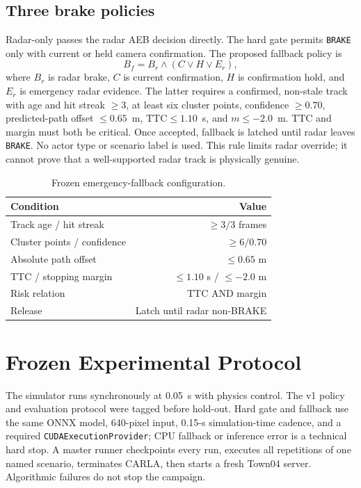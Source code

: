 \documentclass[conference]{IEEEtran}
\begin{document}
\subsection{Three brake policies}
Radar-only passes the radar AEB decision directly. The hard gate permits
\texttt{BRAKE} only with current or held camera confirmation. The proposed
fallback policy is
\begin{equation}
 B_f=B_r\land(C\lor H\lor E_r),
\end{equation}
where $B_r$ is radar brake, $C$ is current confirmation, $H$ is confirmation
hold, and $E_r$ is emergency radar evidence. The latter requires a confirmed,
non-stale track with age and hit streak $\geq3$, at least six cluster points,
confidence $\geq0.70$, predicted-path offset $\leq0.65$~m,
$\mathrm{TTC}\leq1.10$~s, and $m\leq-2.0$~m. TTC and margin must both be
critical. Once accepted, fallback is latched until radar leaves \texttt{BRAKE}.
No actor type or scenario label is used. This rule limits radar override; it
cannot prove that a well-supported radar track is physically genuine.

\begin{table}[t]
\caption{Frozen emergency-fallback configuration.}
\label{tab:fallback}
\centering
\footnotesize
\begin{tabular}{lr}
\toprule
Condition & Value\\
\midrule
Track age / hit streak & $\geq3/3$ frames\\
Cluster points / confidence & $\geq6/0.70$\\
Absolute path offset & $\leq0.65$ m\\
TTC / stopping margin & $\leq1.10$ s / $\leq-2.0$ m\\
Risk relation & TTC AND margin\\
Release & Latch until radar non-BRAKE\\
\bottomrule
\end{tabular}
\end{table}

\section{Frozen Experimental Protocol}
The simulator runs synchronously at 0.05~s with physics control. The v1 policy
and evaluation protocol were tagged before hold-out. Hard gate and fallback use
the same ONNX model, 640-pixel input, 0.15-s simulation-time cadence, and a
required \texttt{CUDAExecutionProvider}; CPU fallback or inference error is a
technical hard stop. A master runner checkpoints every run, executes all
repetitions of one named scenario, terminates CARLA, then starts a fresh Town04
server. Algorithmic failures do not stop the campaign.
\end{document}
